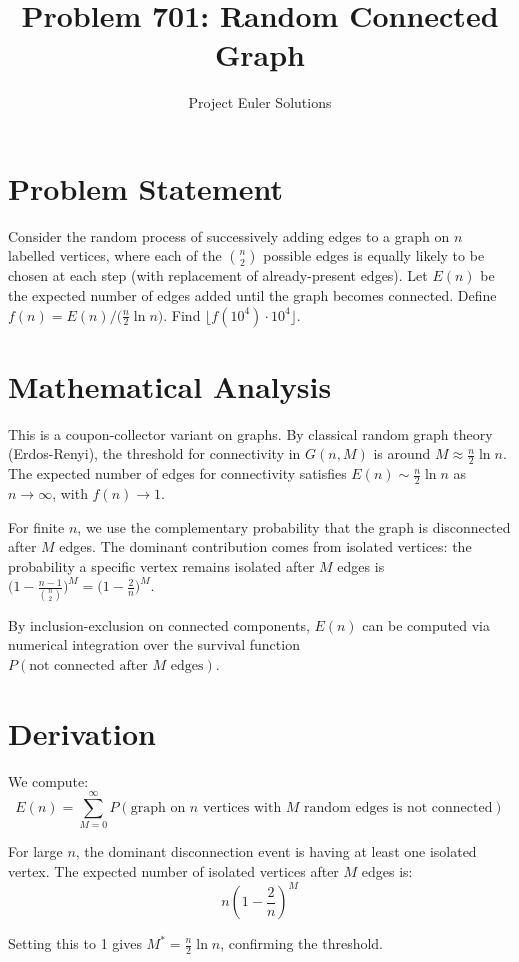 \documentclass[11pt]{article}
\title{Problem 701: Random Connected Graph}
\author{Project Euler Solutions}
\date{}
\begin{document}
\maketitle

\section{Problem Statement}
Consider the random process of successively adding edges to a graph on $n$ labelled vertices, where each of the $\binom{n}{2}$ possible edges is equally likely to be chosen at each step (with replacement of already-present edges). Let $E(n)$ be the expected number of edges added until the graph becomes connected. Define $f(n) = E(n) / \bigl(\tfrac{n}{2}\ln n\bigr)$. Find $\lfloor f(10^4) \cdot 10^4 \rfloor$.

\section{Mathematical Analysis}
This is a coupon-collector variant on graphs. By classical random graph theory (Erdos-Renyi), the threshold for connectivity in $G(n,M)$ is around $M \approx \frac{n}{2}\ln n$. The expected number of edges for connectivity satisfies $E(n) \sim \frac{n}{2}\ln n$ as $n\to\infty$, with $f(n)\to 1$.

For finite $n$, we use the complementary probability that the graph is disconnected after $M$ edges. The dominant contribution comes from isolated vertices: the probability a specific vertex remains isolated after $M$ edges is $\bigl(1 - \frac{n-1}{\binom{n}{2}}\bigr)^M = \bigl(1 - \frac{2}{n}\bigr)^M$.

By inclusion-exclusion on connected components, $E(n)$ can be computed via numerical integration over the survival function $P(\text{not connected after } M \text{ edges})$.

\section{Derivation}
We compute:
$$E(n) = \sum_{M=0}^{\infty} P(\text{graph on } n \text{ vertices with } M \text{ random edges is not connected})$$

For large $n$, the dominant disconnection event is having at least one isolated vertex. The expected number of isolated vertices after $M$ edges is:
$$n \left(1 - \frac{2}{n}\right)^M$$

Setting this to 1 gives $M^* = \frac{n}{2}\ln n$, confirming the threshold.
\end{document}
